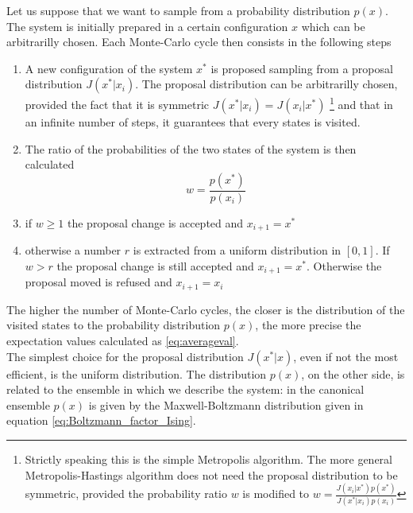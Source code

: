 Let us suppose that we want to sample from a probability distribution $p(x)$. \\
The system is initially prepared in a certain configuration $x$ which can be arbitrarilly chosen. Each Monte-Carlo cycle then consists in the following steps
\begin{enumerate}
    \item A new configuration of the system $x^*$ is proposed sampling from a proposal distribution $J(x^*|x_i)$. The proposal distribution can be arbitrarilly chosen, provided the fact that it is symmetric $J(x^*|x_i) = J(x_i|x^*)$
    \footnote{Strictly speaking this is the simple Metropolis algorithm. The more general Metropolis-Hastings algorithm does not need the proposal distribution to be symmetric, provided the probability ratio $w$ is modified to $w=\frac{J(x_i|x^*)p(x^*)}{J(x^*|x_i)p(x_i)}$}
    and that in an infinite number of steps, it guarantees that 
    every states is visited.
    \item The ratio of the probabilities of the two states of the system is then calculated
    \begin{equation*}
        w = \frac{p(x^*)}{p(x_i)}
    \end{equation*}
    \item if $w \geq 1$ the proposal change is accepted and $x_{i+1} = x^*$
    \item otherwise a number $r$ is extracted from a uniform distribution in $[0,1]$. If $w > r$ the proposal change is still accepted and $x_{i+1} = x^*$. Otherwise the proposal moved is refused and $x_{i+1} = x_i$
\end{enumerate}
The higher the number of Monte-Carlo cycles, the closer is the distribution of the visited states to the probability distribution $p(x)$, the more precise the expectation values calculated as \ref{eq:averageval}. \\
The simplest choice for the proposal distribution $J(x^*|x)$, even if not the most efficient, is the uniform distribution. The distribution $p(x)$, on the other side, is related to the ensemble 
in which we describe the system: in the canonical ensemble $p(x)$ is given by the Maxwell-Boltzmann distribution given in equation \ref{eq:Boltzmann_factor_Ising}.


